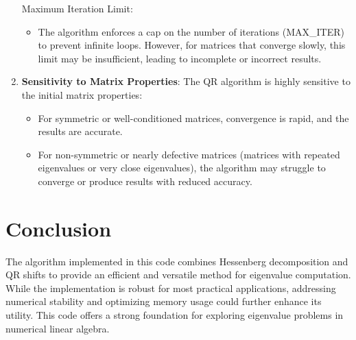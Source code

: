 \documentclass{article}
\begin{document}
\begin{enumerate}
    Maximum Iteration Limit:
    \begin{itemize}
        \item The algorithm enforces a cap on the number of iterations (MAX\_ITER) to prevent infinite loops. However, for matrices that converge slowly, this limit may be insufficient, leading to incomplete or incorrect results.
    \end{itemize}
    
    \item \textbf{Sensitivity to Matrix Properties}: The QR algorithm is highly sensitive to the initial matrix properties:
    \begin{itemize}
        \item For symmetric or well-conditioned matrices, convergence is rapid, and the results are accurate.
        \item For non-symmetric or nearly defective matrices (matrices with repeated eigenvalues or very close eigenvalues), the algorithm may struggle to converge or produce results with reduced accuracy.
    \end{itemize}
\end{enumerate} 


\section{ Conclusion}
The algorithm implemented in this code combines Hessenberg decomposition and QR shifts to provide an efficient and versatile method for eigenvalue computation. While the implementation is robust for most practical applications, addressing numerical stability and optimizing memory usage could further enhance its utility. This code offers a strong foundation for exploring eigenvalue problems in numerical linear algebra.
\end{document}
